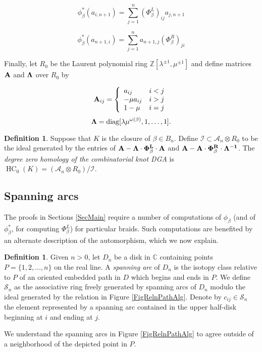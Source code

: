 \documentclass[11pt]{amsart}
\def\Z{{\mathbb Z}}
\def\C{{\mathbb C}}
\def\A{{\mathcal A}}
\newcommand\diag{\operatorname{diag}}
\theoremstyle{definition}
\newtheorem{defn}[thm]{Definition}
\begin{document}
  $$\phi_\beta^*(a_{i,n+1}) = \sum_{j=1}^n(\Phi_\beta^L)_{ij}a_{j,n+1}$$

  $$\phi_\beta^*(a_{n+1,i}) = \sum_{j=1}^na_{n+1,j}(\Phi_\beta^R)_{ji}$$

  Finally, let $R_0$ be the Laurent polynomial ring $\Z[\lambda^{\pm1},\mu^{\pm1}]$ and define matrices $\bf{A}$ and $\bf{\Lambda}$ over $R_0$ by

  \begin{equation}
  {\bf A}_{ij} = 
  \left\{
       \begin{array}{lr}
        a_{ij} & i<j\\
        -\mu a_{ij} & i>j\\
        1-\mu & i = j\\
       \end{array}
  \right.
  \label{def:Amatrix}
  \end{equation}
  \begin{equation}
  {\bf \Lambda} = \diag[\lambda\mu^{\omega(\beta)},1,\ldots,1].
  \label{defn:Lambda}
  \end{equation}

  \begin{defn}
  Suppose that $K$ is the closure of $\beta\in B_n$. Define $\mathcal{I}\subset \A_n\otimes R_0$ to be the ideal generated by the entries of $\bf{A} - \Lambda\cdot\Phi_\beta^L\cdot \bf{A}$ and $\bf{A} - \bf{A}\cdot\Phi_\beta^R\cdot\Lambda^{-1}$. The \emph{degree zero homology of the combinatorial knot DGA} is $\operatorname{HC}_0(K) = (\A_n\otimes R_0)/\mathcal{I}$.
  \label{defn:HC_0}
  \end{defn}
  
\subsection{Spanning arcs}
\label{SecSpanArcs}

  The proofs in Sections \ref{SecMain} require a number of computations of $\phi_\beta$ (and of $\phi_{\beta}^\ast$, for computing $\Phi_\beta^L$) for particular braids. Such computations are benefited by an alternate description of the automorphism, which we now explain.

  \begin{defn}Given $n>0$, let $D_n$ be a disk in $\C$ containing points $P=\{1,2,\ldots,n\}$ on the real line. A \emph{spanning arc} of $D_n$ is the isotopy class relative to $P$ of an oriented embedded path in $D$ which begins and ends in $P$. We define $\mathscr S_n$ as the associative ring freely generated by spanning arcs of $D_n$ modulo the ideal generated by the relation in Figure \ref{FigRelnPathAlg}. Denote by $c_{ij}\in\mathscr S_n$ the element represented by a spanning arc contained in the upper half-disk beginning at $i$ and ending at $j$.
  \label{DefnSpanningArcAlg}
  \end{defn}
  We understand the spanning arcs in Figure \ref{FigRelnPathAlg} to agree outside of a neighborhood of the depicted point in $P$.
\end{document}
